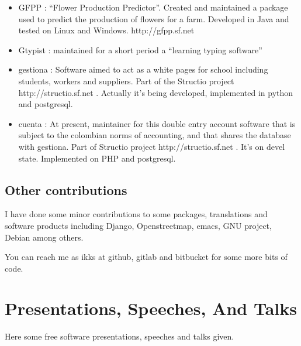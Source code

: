 \documentclass{article}
\begin{document}
\begin{itemize}
\item GFPP : ``Flower Production Predictor''. Created and maintained a
  package used to predict the production of flowers for a
  farm. Developed in Java and tested on Linux and Windows. http://gfpp.sf.net
\item Gtypist : maintained for a short period a ``learning typing software''
\item gestiona : Software aimed to act as a white pages for school
  including students, workers and suppliers.  Part of the 
  Structio project http://structio.sf.net . Actually it's being
  developed, implemented in python and postgresql.
\item cuenta : At present, maintainer for this double entry account
  software that is subject to the colombian norms of accounting, and
  that shares the database with gestiona. Part of Structio  project
  http://structio.sf.net . It's on devel state. Implemented on
  PHP and postgresql.
\end{itemize}


\subsection{Other contributions}
\label{sec:contrib}

I have done some minor contributions to some packages, translations and software products including Django, Openstreetmap, emacs, GNU project, Debian among others.

You can reach me as ikks at github, gitlab and bitbucket for some more bits of code.

\section{Presentations, Speeches, And Talks}

Here some free software presentations, speeches and talks given.
\end{document}
